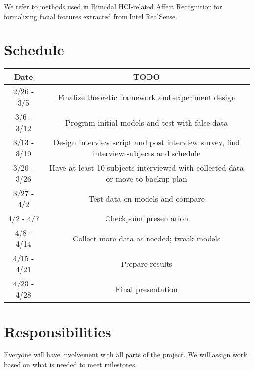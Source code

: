 \documentclass[12pt,letterpaper]{article}
\begin{document}
We refer to methods used in \href{http://dl.acm.org/citation.cfm?id=1027958}{Bimodal HCI-related Affect Recognition} for formalizing facial features extracted from Intel RealSense. 

\newpage
\section{Schedule}

\begin{center}
\begin{tabular}{ c | c }
\bf{Date} & \bf{TODO} \\ \hline
2/26 - 3/5 & Finalize theoretic framework and experiment design\\
3/6 - 3/12 & Program initial models and test with false data\\
3/13 - 3/19 & Design interview script and post interview survey, find interview subjects and schedule\\
3/20 - 3/26 & Have at least 10 subjects interviewed with collected data or move to backup plan\\
3/27 - 4/2 & Test data on models and compare\\
4/2 - 4/7 & Checkpoint presentation\\
4/8 - 4/14 & Collect more data as needed; tweak models\\
4/15 - 4/21 & Prepare results\\
4/23 - 4/28 & Final presentation
\end{tabular}
\end{center}

\section{Responsibilities}
Everyone will have involvement with all parts of the project.  We will assign work based on what is needed to meet milestones.



\end{document}
